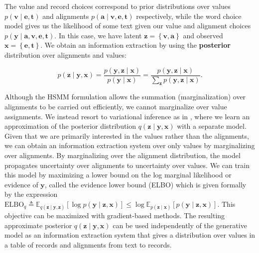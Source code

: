 \documentclass[11pt]{article}
\newcommand\set[1]{\left\{#1\right\}}
\newcommand\Es[2]{\mathbb{E}_{#1}\left[#2\right]}
\newcommand{\ba}{\mathbf{a}}
\newcommand{\be}{\mathbf{e}}
\newcommand{\bt}{\mathbf{t}}
\newcommand{\bv}{\mathbf{v}}
\newcommand{\bx}{\mathbf{x}}
\newcommand{\by}{\mathbf{y}}
\newcommand{\bz}{\mathbf{z}}
\begin{document}
The value and record choices correspond to prior distributions over values $p(\bv\mid\be,\bt)$
and alignments $p(\ba\mid\bv,\be,\bt)$ respectively,
while the word choice model gives us the likelihood of some text given our value and alignment choices $p(\by\mid\ba,\bv,\be,\bt)$.
In this case, we have latent $\bz = \set{\bv,\ba}$ and observed $\bx = \set{\be,\bt}$.
We obtain an information extraction by using the 
\textbf{posterior} distribution over alignments and values:
\begin{linenomath*}
$$
p(\bz\mid\by,\bx)=\frac{p(\by,\bz\mid\bx)}{p(\by\mid\bx)}=\frac{p(\by,\bz\mid\bx)}{\sum_\bz p(\by,\bz\mid\bx)}.
$$
\end{linenomath*}
Although the HSMM formulation allows the summation (marginalization) over alignments to be carried out efficiently,
we cannot marginalize over value assignments.
We instead resort to variational inference as in \citet{deng2018attn},
where we learn an approximation of the posterior distribution $q(\bz\mid\by,\bx)$
with a separate model.
Given that we are primarily interested in the values rather than the alignments,
we can obtain an information extraction system over only values by marginalizing over alignments.
By marginalizing over the alignment distribution, the model propagates uncertainty over alignments
to uncertainty over values.
We can train this model by maximizing a lower bound on the log marginal likelihood or evidence of $\by$,
called the evidence lower bound (ELBO) which is given formally by the expression
$\textrm{ELBO}_q \triangleq \Es{q(\bz\mid\by,\bz)}{\log p(\by\mid\bz,\bx)}\leq \log \Es{p(\bz\mid\bx)} {p(\by\mid\bz,\bx)}$.
This objective can be maximized with gradient-based methods.
The resulting approximate posterior $q(\bz\mid\by,\bx)$ can be used independently of the 
generative model as an information extraction system that gives a distribution over
values in a table of records and alignments from text to records.
\end{document}
